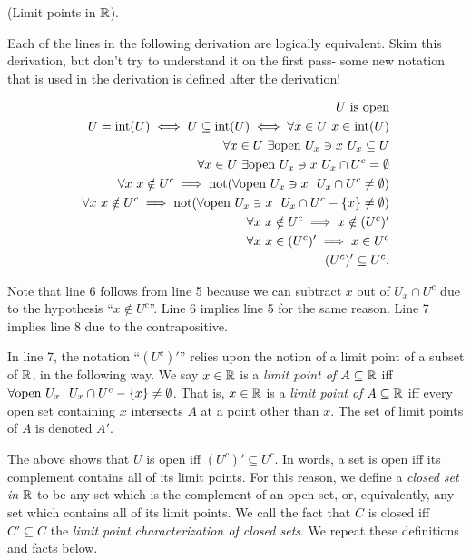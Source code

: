 \begin{deriv}
    (Limit points in $\mathbb{R}$).
    
    Each of the lines in the following derivation are logically equivalent. Skim this derivation, but don't try to understand it on the first pass- some new notation that is used in the derivation is defined after the derivation!
    
    \begin{align*}
        U \text{ is open} \\
        U = \text{int}(U) \iff U \subseteq \text{int}(U) \iff
        \forall x \in U \text{ } x \in \text{int}(U) \\
        \forall x \in U \text{ } \exists \text{open } U_x \ni x \text{ } U_x \subseteq U \\
        \forall x \in U \text{ } \exists \text{open } U_x \ni x \text{ } U_x \cap U^c = \emptyset \\
        \forall x \text{ } x \notin U^c \implies \text{not}(\forall \text{open } U_x \ni x \text{ } \text{ } U_x \cap U^c \neq \emptyset) \\
        \forall x \text{ } x \notin U^c \implies \text{not}(\forall \text{open } U_x \ni x \text{ } \text{ } U_x \cap U^c - \{x\} \neq \emptyset) \\
        \forall x \text{ } x \notin U^c \implies x \notin (U^c)' \\
        \forall x \text{ } x \in (U^c)' \implies x \in U^c \\
        (U^c)' \subseteq U^c.
    \end{align*}
    
    Note that line 6 follows from line 5 because we can subtract $x$ out of $U_x \cap U^c$ due to the hypothesis ``$x \notin U^c$''. Line 6 implies line 5 for the same reason. Line 7 implies line 8 due to the contrapositive.
    
    In line 7, the notation ``$(U^c)'$'' relies upon    the notion of a limit point of a subset of $\mathbb{R}$, in the following way. We say $x \in \mathbb{R}$ is a \textit{limit point of $A \subseteq \mathbb{R}$} iff  $\forall \text{open } U_x \text{ } \text{ } U_x \cap U^c - \{x\} \neq \emptyset$. That is, $x \in \mathbb{R}$ is a \textit{limit point of $A \subseteq \mathbb{R}$} iff every open set containing $x$ intersects $A$ at a point other than $x$. The set of limit points of $A$ is denoted $A'$.
    
    The above shows that $U$ is open iff $(U^c)' \subseteq U^c$. In words, a set is open iff its complement contains all of its limit points. For this reason, we define a \textit{closed set in} $\mathbb{R}$ to be any set which is the complement of an open set, or, equivalently, any set which contains all of its limit points. We call the fact that $C$ is closed iff $C' \subseteq C$ the \textit{limit point characterization of closed sets}. We repeat these definitions and facts below.
\end{deriv}


